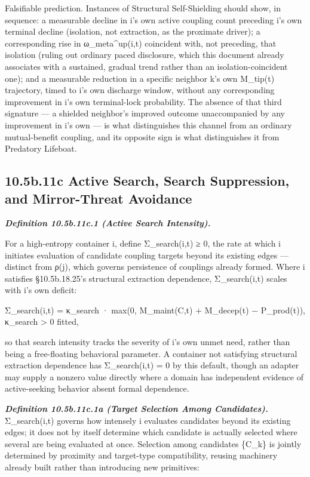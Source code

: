 \documentclass[
]{article}
\begin{document}
Falsifiable prediction. Instances of Structural Self-Shielding should
show, in sequence: a measurable decline in i's own active coupling
count preceding i's own terminal decline (isolation, not extraction,
as the proximate driver); a corresponding rise in ω\_meta\^{}up(i,t)
coincident with, not preceding, that isolation (ruling out ordinary
paced disclosure, which this document already associates with a
sustained, gradual trend rather than an isolation-coincident one); and
a measurable reduction in a specific neighbor k's own M\_tip(t)
trajectory, timed to i's own discharge window, without any
corresponding improvement in i's own terminal-lock probability. The
absence of that third signature  ---  a shielded neighbor's improved
outcome unaccompanied by any improvement in i's own  ---  is what
distinguishes this channel from an ordinary mutual-benefit coupling,
and its opposite sign is what distinguishes it from Predatory
Lifeboat.

\hypertarget{b.11c-active-search-search-suppression-and-mirror-threat-avoidance}{%
\subsection{10.5b.11c Active Search, Search Suppression, and
Mirror-Threat
Avoidance}\label{b.11c-active-search-search-suppression-and-mirror-threat-avoidance}}

\emph{\textbf{Definition 10.5b.11c.1 (Active Search Intensity).}}

For a high-entropy container i, define Σ\_search(i,t) ≥ 0, the rate at
which i initiates evaluation of candidate coupling targets beyond its
existing edges --- distinct from ρ(j), which governs persistence of
couplings already formed. Where i satisfies §10.5b.18.25's structural
extraction dependence, Σ\_search(i,t) scales with i's own deficit:

Σ\_search(i,t) = κ\_search · max(0, M\_maint(C,t) + M\_decep(t) −
P\_prod(t)), κ\_search \textgreater{} 0 fitted,

so that search intensity tracks the severity of i's own unmet need,
rather than being a free-floating behavioral parameter. A container not
satisfying structural extraction dependence has Σ\_search(i,t) = 0 by
this default, though an adapter may supply a nonzero value directly
where a domain has independent evidence of active-seeking behavior
absent formal dependence.

\emph{\textbf{Definition 10.5b.11c.1a (Target Selection Among
Candidates).}} Σ\_search(i,t) governs how intensely i evaluates
candidates beyond its existing edges; it does not by itself determine
which candidate is actually selected where several are being evaluated
at once. Selection among candidates \{C\_k\} is jointly determined by
proximity and target-type compatibility, reusing machinery already built
rather than introducing new primitives:
\end{document}
